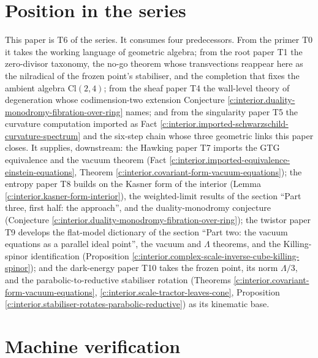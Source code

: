 \documentclass[11pt]{article}
\theoremstyle{definition}
\theoremstyle{plain}
\providecommand{\Cl}{}\renewcommand{\Cl}{\mathrm{Cl}}
\begin{document}
\section{Position in the series}

\label{c:note.interior.setting-position-series}
This paper is T6 of the series. It consumes four predecessors. From the primer T0 \cite{ButlerT0} it takes the working language of geometric algebra; from the root paper T1 \cite{ButlerT1} the zero-divisor taxonomy, the no-go theorem whose transvections reappear here as the nilradical of the frozen point's stabiliser, and the completion that fixes the ambient algebra $\Cl(2,4)$; from the sheaf paper T4 \cite{ButlerT4} the wall-level theory of degeneration whose codimension-two extension Conjecture \ref{c:interior.duality-monodromy-fibration-over-ring} names; and from the singularity paper T5 \cite{ButlerT5} the curvature computation imported as Fact \ref{c:interior.imported-schwarzschild-curvature-spectrum} and the six-step chain whose three geometric links this paper closes. It supplies, downstream: the Hawking paper T7 \cite{ButlerT7} imports the GTG equivalence and the vacuum theorem (Fact \ref{c:interior.imported-equivalence-einstein-equations}, Theorem \ref{c:interior.covariant-form-vacuum-equations}); the entropy paper T8 \cite{ButlerT8} builds on the Kasner form of the interior (Lemma \ref{c:interior.kasner-form-interior}), the weighted-limit results of the section ``Part three, first half: the approach'', and the duality-monodromy conjecture (Conjecture \ref{c:interior.duality-monodromy-fibration-over-ring}); the twistor paper T9 \cite{ButlerT9} develops the flat-model dictionary of the section ``Part two: the vacuum equations as a parallel ideal point'', the vacuum and $\Lambda$ theorems, and the Killing-spinor identification (Proposition \ref{c:interior.complex-scale-inverse-cube-killing-spinor}); and the dark-energy paper T10 \cite{ButlerT10} takes the frozen point, its norm $\Lambda/3$, and the parabolic-to-reductive stabiliser rotation (Theorems \ref{c:interior.covariant-form-vacuum-equations}, \ref{c:interior.scale-tractor-leaves-cone}, Proposition \ref{c:interior.stabiliser-rotates-parabolic-reductive}) as its kinematic base.

\section{Machine verification}
\end{document}
